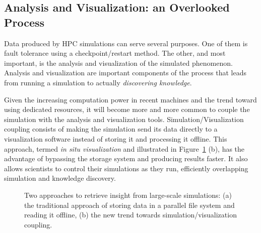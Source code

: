 \subsection{Analysis and Visualization: an Overlooked Process}

	Data produced by HPC simulations can serve several purposes. 
	One of them is fault tolerance using a checkpoint/restart method.
	The other, and most important, is the analysis and visualization of the simulated phenomenon.
	Analysis and visualization are important components of the process that leads
	from running a simulation to actually \emph{discovering knowledge}.
	
	Given the increasing computation power in recent machines and the trend toward using dedicated resources,
	it will become more and more common to couple the simulation with the analysis and visualization tools.
	Simulation/Visualization coupling consists of making the simulation send its data directly to
	a visualization software instead of storing it and processing it offline.
	This approach, termed \textit{in situ visualization} and illustrated in
	Figure~\ref{fig:simviz} (b), has the advantage of bypassing the 
	storage system and producing results faster. It also allows scientists to control their simulations
	as they run, efficiently overlapping simulation and knowledge discovery.
	
	\begin{figure}
		\begin{center}
		\caption{Two approaches to retrieve 
		insight from large-scale simulations: (a) the traditional approach of storing data in a parallel
		file system and reading it offline, (b) the new trend towards simulation/visualization coupling.}\label{fig:simviz}
		\end{center}
	\end{figure}
	
